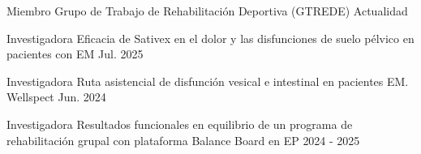 

\begin{cventries}
  \cventry
    {Miembro} %
    {Grupo de Trabajo de Rehabilitación Deportiva (GTREDE)} %
    {} %
    {Actualidad} %
    {}

  \cventry
    {Investigadora} %
    {Eficacia de Sativex en el dolor y las disfunciones de suelo pélvico en pacientes con EM} %
    {} %
    {Jul. 2025} %
    {}

  \cventry
    {Investigadora} %
    {Ruta asistencial de disfunción vesical e intestinal en pacientes EM. Wellspect} %
    {} %
    {Jun. 2024} %
    {}

  \cventry
    {Investigadora} %
    {Resultados funcionales en equilibrio de un programa de rehabilitación grupal con plataforma Balance Board en EP} %
    {} %
    {2024 - 2025} %
    {}
\end{cventries}

